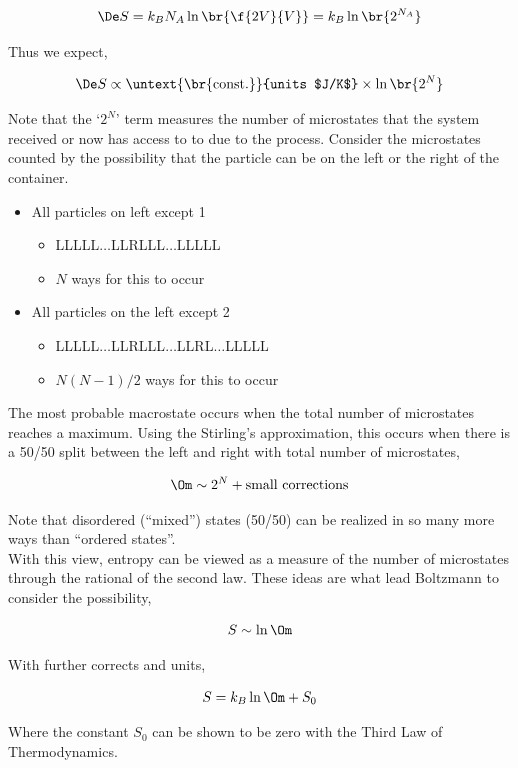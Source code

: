 \documentclass{article}
\begin{document}
\[ \De S = k_BN_A \ln\br{\f{2V}{V}} = k_B \ln\br{2^{N_A}} \]

Thus we expect,

\[ \De S \propto \untext{\br{\text{const.}}}{units $J/K$} \times \ln \br{2^N} \]

Note that the `$2^N$' term measures the number of microstates that the system received or now has access to to due to the process. Consider the microstates counted by the possibility that the particle can be on the left or the right of the container.\\

\begin{itemize}
        \item All particles on left except 1
        \begin{itemize}
                \item LLLLL$\ldots$LLRLLL$\ldots$LLLLL
                \item $N$ ways for this to occur
        \end{itemize}
        \item All particles on the left except 2
        \begin{itemize}
                \item LLLLL$\ldots$LLRLLL$\ldots$LLRL$\ldots$LLLLL
                \item $N(N-1)/2$ ways for this to occur
        \end{itemize}
\end{itemize}

The most probable macrostate occurs when the total number of microstates reaches a maximum. Using the Stirling's approximation, this occurs when there is a 50/50 split between the left and right with total number of microstates,

\[ \Om \sim 2^N + \text{small corrections} \]

Note that disordered (``mixed'') states (50/50) can be realized in so many more ways than ``ordered states''. \\

With this view, entropy can be viewed as a measure of the number of microstates through the rational of the second law. These ideas are what lead Boltzmann to consider the possibility,

\[ S \sim \ln \Om \]

With further corrects and units,

\[ S = k_B \ln \Om +S_0 \]

Where the constant $S_0$ can be shown to be zero with the Third Law of Thermodynamics.
\end{document}
